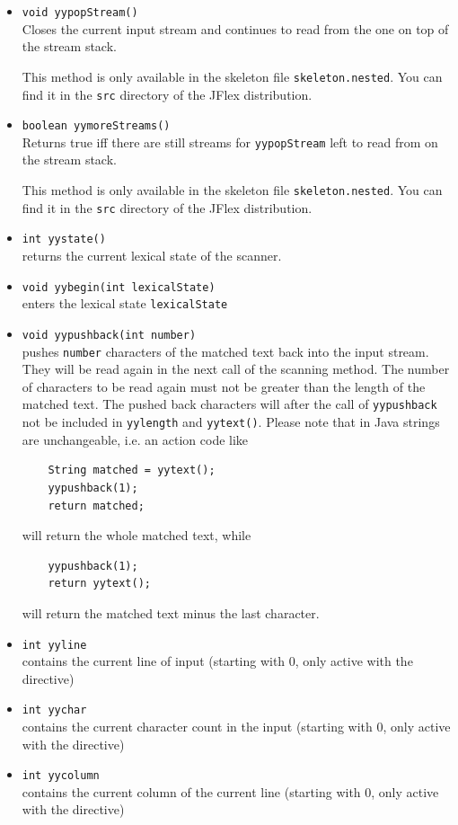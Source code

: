 \documentclass[11pt]{scrartcl}
\begin{document}
\begin{itemize}
\item \texttt{void yypopStream()}\\
  Closes the current input stream and continues to
  read from the one on top of the stream stack.

  This method is only available in the skeleton file
  \texttt{skeleton.nested}. You can find it in the 
  \texttt{src} directory of the JFlex distribution.

\item \texttt{boolean yymoreStreams()}\\
  Returns true iff there are still streams for \texttt{yypopStream} 
  left to read from on the stream stack.

  This method is only available in the skeleton file
  \texttt{skeleton.nested}. You can find it in the 
  \texttt{src} directory of the JFlex distribution. 

\item \texttt{int yystate()}\\
  returns the current lexical state of the scanner.

\item \texttt{void yybegin(int lexicalState)}\\
  enters the lexical state \texttt{lexicalState}

\item \texttt{void yypushback(int number)}\\
  pushes \texttt{number} characters of the matched text back into the input stream. 
  They will be read again in the next call of the scanning method. 
  The number of characters to be read again must not be greater than the length
  of the matched text. The pushed back characters will after the call of 
  \texttt{yypushback} not be included in \texttt{yylength} and \texttt{yytext()}.
  Please note that in Java strings are unchangeable, i.e. an action code like
  \begin{verbatim}
    String matched = yytext();
    yypushback(1);
    return matched;
  \end{verbatim}
  will return the whole matched text, while    
  \begin{verbatim}
    yypushback(1);
    return yytext();
  \end{verbatim}
  will return the matched text minus the last character.

\item\texttt{int yyline}\\
  contains the current line of input (starting with 0, only active with
  the \texttt{} directive)

\item \texttt{int yychar}\\
  contains the current character count in the input (starting with 0,
  only active with the \texttt{} directive)

\item \texttt{int yycolumn}\\
  contains the current column of the current line (starting with 0, only
  active with the \texttt{} directive)

\end{itemize}
\end{document}
